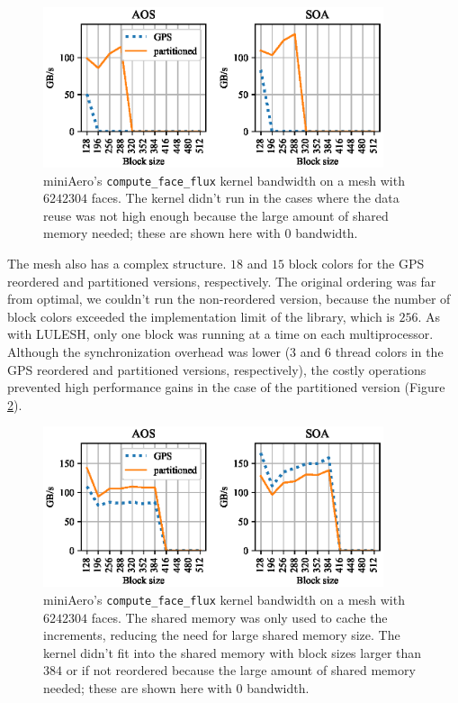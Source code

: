 \begin{figure}[Htbp]
\centering
\includegraphics[width=10cm]{fig/mini_aero_bw_crash.eps}
\caption{miniAero's \texttt{compute\_face\_flux} kernel bandwidth on a mesh 
with $6242304$ faces. The kernel didn't run in the cases where the data reuse 
was not high enough because the large amount of shared memory needed; these 
are shown here with $0$ bandwidth.}
  \label{fig:mini_aero_bw_crash}
\end{figure}

The mesh also has a complex structure. $18$ and $15$ block colors for the GPS
reordered and partitioned versions, respectively. The original ordering was
far from optimal, we couldn't run the non-reordered version, because the 
number of block colors exceeded the implementation limit of the library, which 
is $256$. As with LULESH, only one block was running at a time on each 
multiprocessor. Although the synchronization overhead was lower ($3$ and $6$ 
thread colors in the GPS reordered and partitioned versions, respectively), the 
costly operations prevented high performance gains in the case of the 
partitioned version (Figure \ref{fig:mini_aero_bw_small-cache}).

\begin{figure}[Htbp]
\centering
\includegraphics[width=10cm]{fig/mini_aero_bw_small-cache.eps}
\caption{miniAero's \texttt{compute\_face\_flux} kernel bandwidth on a mesh 
with $6242304$ faces. The shared memory was only used to cache the increments,
reducing the need for large shared memory size. The kernel didn't fit into the
shared memory with block sizes larger than $384$ or if not reordered because
the large amount of shared memory needed; these are shown here with $0$
bandwidth.} \label{fig:mini_aero_bw_small-cache}
\end{figure}

